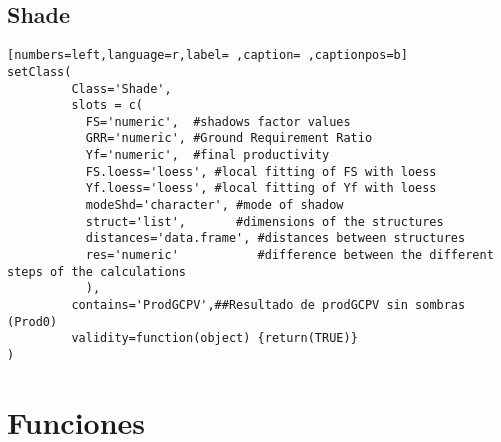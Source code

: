 \subsection{Shade}
\label{sec:org234b371}
\begin{lstlisting}[numbers=left,language=r,label= ,caption= ,captionpos=b]
setClass(
         Class='Shade',
         slots = c(
           FS='numeric',  #shadows factor values
           GRR='numeric', #Ground Requirement Ratio
           Yf='numeric',  #final productivity
           FS.loess='loess', #local fitting of FS with loess
           Yf.loess='loess', #local fitting of Yf with loess
           modeShd='character', #mode of shadow
           struct='list',       #dimensions of the structures
           distances='data.frame', #distances between structures
           res='numeric'           #difference between the different steps of the calculations
           ),
         contains='ProdGCPV',##Resultado de prodGCPV sin sombras (Prod0)
         validity=function(object) {return(TRUE)}
)
\end{lstlisting}
\section{Funciones}
\label{sec:orgc1ff498}
